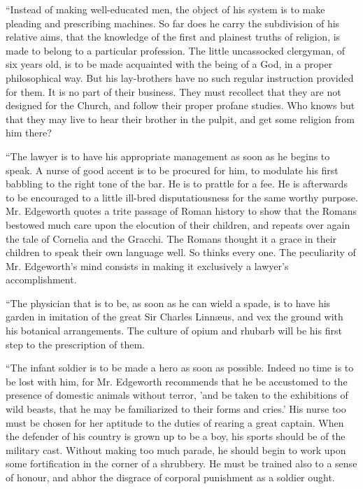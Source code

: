``Instead
of making well-educated men, the object of his system is to make
pleading and prescribing machines. So far does he carry
the subdivision of his relative aims, that the knowledge of the first
and plainest truths of religion, is made to belong to a particular
profession. The little uncassocked clergyman, of six years old, is to
be made acquainted with the being of a God, in a proper philosophical
way. But his lay-brothers have no such regular instruction provided
for them. It is no part of their business. They must recollect that
they are not designed for the Church, and follow their proper profane
studies. Who knows but that they may live to hear their brother in the
pulpit, and get some religion from him there?

``The
lawyer is to have his appropriate management as soon as he begins to
speak. A nurse of good accent is to be procured for him, to modulate
his first babbling to the right tone of the bar. He is to prattle for
a fee. He is afterwards to be encouraged to a little ill-bred
disputatiousness for the same worthy purpose. Mr. Edgeworth quotes a
trite passage of Roman history to show that the Romans bestowed much
care upon the elocution of their children, and repeats over again the
tale of Cornelia and the Gracchi. The Romans thought it a grace in
their children to speak their own language well. So thinks every one.
The peculiarity of Mr. Edgeworth's mind consists in making it
exclusively a lawyer's accomplishment.

``The
physician that is to be, as soon as he can wield a spade, is to have
his garden in imitation of the great Sir Charles Linnæus, and vex the
ground with his botanical arrangements. The culture of opium and
rhubarb will be his first step to the prescription of them.

``The
infant soldier is to be made a hero as soon as possible. Indeed no
time is to be lost with him, for Mr. Edgeworth recommends that he be
accustomed to the presence of domestic animals without terror, 'and be
taken to the exhibitions of wild beasts, that he may be familiarized
to their forms and cries.' His nurse too must be chosen for her
aptitude to the duties of rearing a great captain. When the defender
of his country is grown up to be a boy, his sports should be of the
military cast. Without making too much parade, he should begin to work
upon some fortification in the corner of a shrubbery. He must be
trained also to a sense of honour, and abhor the disgrace of corporal
punishment as a soldier ought.


